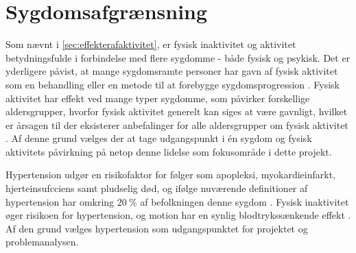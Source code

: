 \section{Sygdomsafgrænsning}
Som nævnt i \autoref{sec:effekterafaktivitet}, er fysisk inaktivitet og aktivitet betydningsfulde i forbindelse med flere sygdomme - både fysisk og psykisk. Det er yderligere påvist, at mange sygdomsramte personer har gavn af fysisk aktivitet som en behandling eller en metode til at forebygge sygdomsprogression \cite{motionsraad2007,pedersen2011}. Fysisk aktivitet har effekt ved mange typer sygdomme, som påvirker forskellige aldersgrupper, hvorfor fysisk aktivitet generelt kan siges at være gavnligt, hvilket er årsagen til der eksisterer anbefalinger for alle aldersgrupper om fysisk aktivitet \cite{pedersen2011}. Af denne grund vælges der at tage udgangspunkt i én sygdom og fysisk aktivitets påvirkning på netop denne lidelse som fokusområde i dette projekt.

Hypertension udgør en risikofaktor for følger som apopleksi, myokardieinfarkt, hjerteinsufcciens samt pludselig død, og ifølge nuværende definitioner af hypertension har omkring $20~\%$ af befolkningen denne sygdom \cite{pedersen2011}. Fysisk inaktivitet øger risikoen for hypertension, og motion har en synlig blodtrykssænkende effekt \cite{olsen2015}. Af den grund vælges hypertension som udgangspunktet for projektet og problemanalysen. 